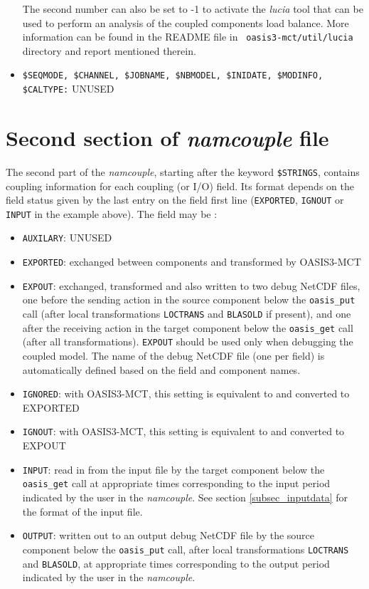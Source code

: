 \begin{itemize}
The second number can also be set to -1 to activate the {\it lucia}
tool that can be used to perform an analysis of the coupled components
load balance. More information can be found in the README file in {\tt
  oasis3-mct/util/lucia} directory and report mentioned therein.
 
\item {\tt \$SEQMODE, \$CHANNEL, \$JOBNAME, \$NBMODEL, \$INIDATE, \$MODINFO, \$CALTYPE:} UNUSED

\end{itemize}


\section{Second section of {\it namcouple} file }
\label{subsec_namcouplesecond}

The second part of the {\it namcouple}, starting after the keyword
{\tt \$STRINGS}, contains coupling information for each coupling (or
I/O) field.  Its format depends on the field status given by the last
entry on the field first line ({\tt EXPORTED}, {\tt IGNOUT} or {\tt
  INPUT} in the example above). The field may be :

\begin{itemize}
\item {\tt AUXILARY}: UNUSED
\item {\tt EXPORTED}: exchanged between components and
  transformed by OASIS3-MCT
\item {\tt EXPOUT}: exchanged, transformed and also written to two
  debug NetCDF files, one before the sending action in the source
  component below the {\tt oasis\_put} call (after local transformations
  {\tt LOCTRANS} and {\tt BLASOLD} if present), and one after the
  receiving action in the target component below the {\tt oasis\_get} call
  (after all transformations). {\tt EXPOUT} should be used only when
  debugging the coupled model. The name of the debug NetCDF file
  (one per field) is automatically defined based on the field and
  component names.
\item {\tt IGNORED}: with OASIS3-MCT, this setting is equivalent to
  and converted to EXPORTED
\item {\tt IGNOUT}: with OASIS3-MCT, this setting is equivalent to and
  converted to EXPOUT
\item {\tt INPUT}: read in from the input file by the target component
  below the {\tt oasis\_get} call at
  appropriate times corresponding to the input period indicated by the
  user in the {\it namcouple}. See section \ref{subsec_inputdata} for
  the format of the input file.
\item {\tt OUTPUT}: written out to an output debug NetCDF file by the
  source component below the {\tt oasis\_put} call, after local
  transformations {\tt LOCTRANS} and {\tt BLASOLD}, at appropriate
  times corresponding to the output period indicated by the user in
  the {\it namcouple}.

\end{itemize}

